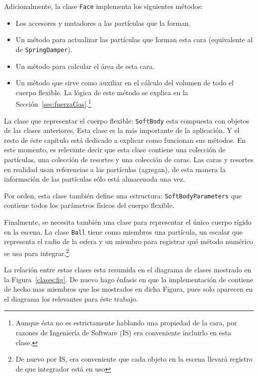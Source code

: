 Adicionalmente, la clase \texttt{Face} implementa los siguientes métodos:
\begin{itemize}
 \item Los accesores y mutadores a las partículas que la forman.
 \item Un método para actualizar las partículas que forman esta cara (equivalente al de \texttt{SpringDamper}).
 \item Un método para calcular el área de esta cara.
 \item Un método que sirve como auxiliar en el cálculo del volumen de todo el cuerpo flexible. La lógica de este método se explica en la Sección~\ref{sec:fuerzaGas}.\footnote{Aunque ésta no es estrictamente hablando una propiedad de la cara, por razones de Ingeniería de Software (IS) era conveniente incluirlo en esta clase.}
\end{itemize}

La clase que representar el cuerpo flexible: \texttt{SoftBody} esta compuesta con objetos de las clases anteriores.
Esta clase es la más importante de la aplicación.
Y el resto de éste capítulo está dedicado a explicar como funcionan sus métodos.
En este momento, es relevante decir que esta clase contiene una colección de partículas, una colección de resortes y una colección de caras.
Las caras y resortes en realidad usan referencias a las partículas (agregan), de esta manera la información de las partículas sólo está almacenada una vez.

Por orden, esta clase también define una estructura: \texttt{SoftBodyParameters} que contiene todos los parámetros físicos del cuerpo flexible. 
 
Finalmente, se necesita también una clase para representar el único cuerpo rígido en la escena.
La clase \texttt{Ball} tiene como miembros una partícula, un escalar que representa el radio de la esfera y un miembro para registrar qué método numérico se usa para integrar.\footnote{De nuevo por IS, era conveniente que cada objeto en la escena llevará registro de que integrador está en uso}

La relación entre estas clases esta resumida en el diagrama de clases mostrado en la Figura~\ref{clases:fig}. De nuevo hago énfasis en que la implementación de contiene de hecho mas miembros que los mostrados en dicha Figura, pues solo aparecen en el diagrama los relevantes para éste trabajo.

